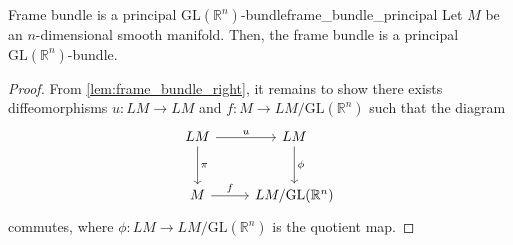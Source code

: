 \begin{theorem}{Frame bundle is a principal \(\mathrm{GL}(\mathbb{R}^n)\)-bundle}{frame_bundle_principal}
    Let \(M\) be an \(n\)-dimensional smooth manifold. Then, the frame bundle  is a principal \(\mathrm{GL}(\mathbb{R}^n)\)-bundle.
\end{theorem}
\begin{proof}
    From \cref{lem:frame_bundle_right}, it remains to show there exists diffeomorphisms \(u : LM \to LM\) and \(f : M \to LM/\mathrm{GL}(\mathbb{R}^n)\) such that the diagram
    \begin{equation*}
        \begin{tikzcd}[column sep = normal, row sep = large]
            LM \arrow{r}{u} \arrow{d}{\pi} & LM \arrow{d}{\phi}\\
            M \arrow{r}{f} & LM/\mathrm{GL}(\mathbb{R}^n)
        \end{tikzcd}
    \end{equation*}
    commutes, where \(\phi : LM \to LM/\mathrm{GL}(\mathbb{R}^n)\) is the quotient map. \todo
\end{proof}


